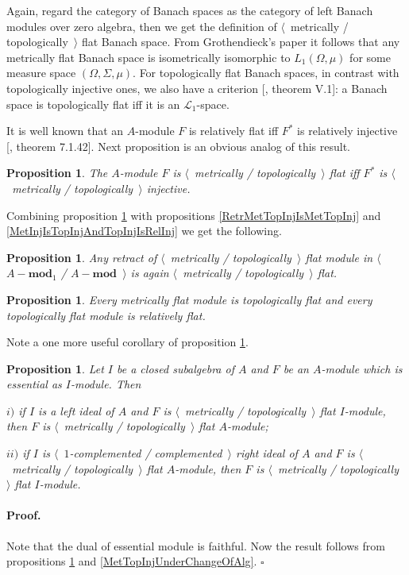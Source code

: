 \documentclass[12pt]{article}
\newtheorem{proposition}[theorem]{Proposition}
\renewenvironment{proof}{\paragraph{Proof.}}{\hfill$\square$\medskip}
\begin{document}
Again, regard the category of Banach spaces as the category of left Banach modules over zero algebra, then we get the definition of $\langle$~metrically / topologically~$\rangle$ flat Banach space. From Grothendieck's paper \cite{GrothMetrProjFlatBanSp} it follows that any metrically flat Banach space is isometrically isomorphic to $L_1(\Omega,\mu)$ for some measure space $(\Omega,\Sigma,\mu)$. For topologically flat Banach spaces, in contrast with topologically injective ones, we also have a criterion [\cite{StegRethNucOpL1LInfSp}, theorem V.1]: a Banach space is topologically flat iff it is an $\mathscr{L}_1$-space.

It is well known that an $A$-module $F$ is relatively flat iff $F^*$ is relatively injective [\cite{HelBanLocConvAlg}, theorem 7.1.42]. Next proposition is an obvious analog of this result.

\begin{proposition}\label{MetTopFlatCharac} The $A$-module $F$ is $\langle$~metrically / topologically~$\rangle$ flat iff $F^*$ is $\langle$~metrically / topologically~$\rangle$ injective.
\end{proposition}

Combining proposition \ref{MetTopFlatCharac} with propositions  \ref{RetrMetTopInjIsMetTopInj} and \ref{MetInjIsTopInjAndTopInjIsRelInj} we get the following.

\begin{proposition}\label{RetrMetTopFlatIsMetTopFlat} Any retract of $\langle$~metrically / topologically~$\rangle$ flat module in $\langle$~$A-\mathbf{mod}_1$ / $A-\mathbf{mod}$~$\rangle$ is again $\langle$~metrically / topologically~$\rangle$ flat.
\end{proposition}

\begin{proposition}\label{MetFlatIsTopFlatAndTopFlatIsRelFlat} Every metrically flat module is topologically flat and every topologically flat module is relatively flat.
\end{proposition}

Note a one more useful corollary of proposition \ref{MetTopFlatCharac}.

\begin{proposition}\label{MetTopFlatUnderChangeOfAlg} Let $I$ be a closed subalgebra of $A$ and $F$ be an $A$-module which is essential as $I$-module. Then

$i)$ if $I$ is a left ideal of $A$ and $F$ is $\langle$~metrically / topologically~$\rangle$  flat $I$-module, then $F$ is $\langle$~metrically / topologically~$\rangle$ flat $A$-module;

$ii)$ if $I$ is $\langle$~$1$-complemented / complemented~$\rangle$ right ideal of $A$ and $F$ is $\langle$~metrically / topologically~$\rangle$ flat $A$-module, then $F$ is $\langle$~metrically / topologically~$\rangle$ flat $I$-module.
\end{proposition}
\begin{proof} Note that the dual of essential module is faithful. Now the result follows from propositions \ref{MetTopFlatCharac} and \ref{MetTopInjUnderChangeOfAlg}.
\end{proof}
\end{document}
